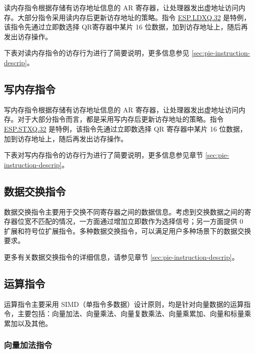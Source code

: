 \documentclass[main\_\_CN.tex]{subfiles}
\begin{document}
读内存指令根据存储有访存地址信息的 AR 寄存器，让处理器发出虚地址访问内存。大部分指令采用读内存后更新访存地址的策略。指令 \hyperref[instruction:ESPLDXQ32]{ESP.LDXQ.32} 是特例，该指令先通过立即数选择 QR寄存器中某片 16 位数据，加到访存地址上，随后再发出访存操作。


下表对读内存指令的访存行为进行了简要说明，更多信息参见 \ref{sec:pie-instruction-descrip}。
\newpage


\subsection{写内存指令}
\label{sec:pie-write-instructions}

写内存指令根据存储有访存地址信息的 AR 寄存器，让处理器发出虚地址访问内存。对于大部分指令而言，都是采用写内存后更新访存地址的策略。指令 \hyperref[instruction:ESPSTXQ32]{ESP.STXQ.32} 是特例，该指令先通过立即数选择 QR 寄存器中某片 16 位数据，加到访存地址上，随后再发出访存操作。


下表对写内存指令的访存行为进行了简要说明，更多信息参见章节 \ref{sec:pie-instruction-descrip}。



\subsection{数据交换指令}
\label{sec:pie-data-exchange-instructions}

数据交换指令主要用于交换不同寄存器之间的数据信息。考虑到交换数据之间的寄存器位宽不匹配的情况，一方面通过增加立即数作为选择信号；另一方面提供 0 扩展和符号位扩展指令。多种数据交换指令，可以满足用户多种场景下的数据交换要求。

更多有关数据交换指令的详细信息，请参见章节 \ref{sec:pie-instruction-descrip}。




\subsection{运算指令}
\label{sec:pie-arithmetic-instructions}

运算指令主要采用 SIMD（单指令多数据）设计原则，均是针对向量数据的运算指令，主要包括：向量加法、向量乘法、向量复数乘法、向量乘累加、向量和标量乘累加以及其他。

\subsubsection{向量加法指令}
\end{document}
